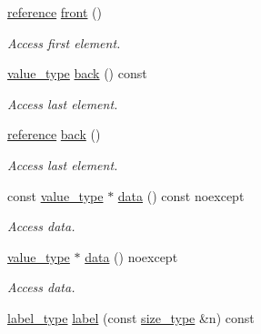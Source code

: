 \begin{DoxyCompactItemize}
\hyperlink{classIceBRG_1_1labeled__array__row__reference_a24c2694c9ca46757f21f7024a229c925}{reference} \hyperlink{classIceBRG_1_1labeled__array__row__reference_aa46c594742690fec656a424ca271350d}{front} ()
\begin{DoxyCompactList}\small\item\em Access first element. \end{DoxyCompactList}\item 
\hyperlink{classIceBRG_1_1labeled__array__row__reference_ae6cfe4bdcb3bc59c3d7613193633f063}{value\+\_\+type} \hyperlink{classIceBRG_1_1labeled__array__row__reference_a770181450611ea00a8d502bc0ac56bfb}{back} () const 
\begin{DoxyCompactList}\small\item\em Access last element. \end{DoxyCompactList}\item 
\hyperlink{classIceBRG_1_1labeled__array__row__reference_a24c2694c9ca46757f21f7024a229c925}{reference} \hyperlink{classIceBRG_1_1labeled__array__row__reference_aca02f3abb7e1cd0e09eca061d7692d3e}{back} ()
\begin{DoxyCompactList}\small\item\em Access last element. \end{DoxyCompactList}\item 
const \hyperlink{classIceBRG_1_1labeled__array__row__reference_ae6cfe4bdcb3bc59c3d7613193633f063}{value\+\_\+type} $\ast$ \hyperlink{classIceBRG_1_1labeled__array__row__reference_ad6361e121660139ffb358731c4899f0b}{data} () const  noexcept
\begin{DoxyCompactList}\small\item\em Access data. \end{DoxyCompactList}\item 
\hyperlink{classIceBRG_1_1labeled__array__row__reference_ae6cfe4bdcb3bc59c3d7613193633f063}{value\+\_\+type} $\ast$ \hyperlink{classIceBRG_1_1labeled__array__row__reference_ae6bc6a700188db9404b6b98da8d4bb09}{data} () noexcept
\begin{DoxyCompactList}\small\item\em Access data. \end{DoxyCompactList}\item 
\hyperlink{classIceBRG_1_1labeled__array__row__reference_a0b7e29867009277fee9102863be2d63a}{label\+\_\+type} \hyperlink{classIceBRG_1_1labeled__array__row__reference_a1280fd88579bdf943ac18d547b8805de}{label} (const \hyperlink{classIceBRG_1_1labeled__array__row__reference_a80c5d11ebfa639fa27894ce288633df0}{size\+\_\+type} \&n) const 

\end{DoxyCompactItemize}
